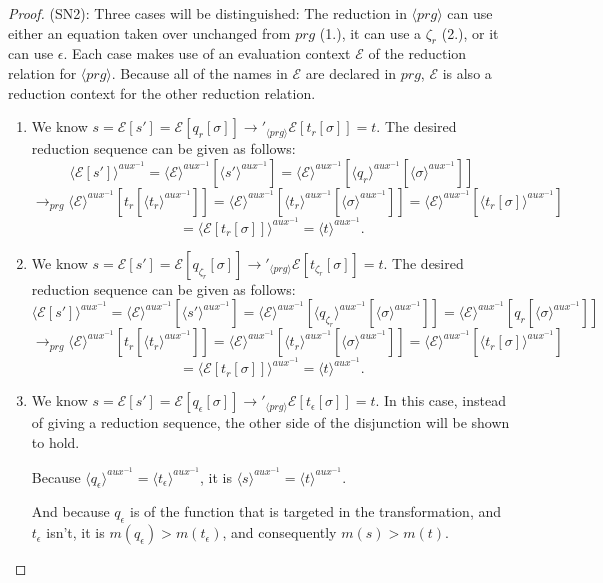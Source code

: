 \begin{proposition}
\begin{proof}
(SN2): Three cases will be distinguished: The reduction in $\langle prg \rangle$ can use either an equation taken over unchanged from $prg$ (1.), it can use a $\zeta_r$ (2.), or it can use $\epsilon$. Each case makes use of an evaluation context $\mathcal{E}$ of the reduction relation for $\langle prg \rangle$. Because all of the names in $\mathcal{E}$ are declared in $prg$, $\mathcal{E}$ is also a reduction context for the other reduction relation.
\begin{enumerate}
\item We know $s = \mathcal{E}[s'] = \mathcal{E}[q_r[\sigma]] \longrightarrow'_{\langle prg \rangle} \mathcal{E}[t_r[\sigma]] = t$. The desired reduction sequence can be given as follows:
\[
\langle \mathcal{E}[s'] \rangle^{aux^{-1}} = \langle \mathcal{E} \rangle^{aux^{-1}}[\langle s' \rangle^{aux^{-1}}] = \langle \mathcal{E} \rangle^{aux^{-1}}[\langle q_r \rangle^{aux^{-1}}[\langle \sigma \rangle^{aux^{-1}}]]
\]
\[
 \longrightarrow_{prg} \langle \mathcal{E} \rangle^{aux^{-1}}[t_r[\langle t_r \rangle^{aux^{-1}}]] = \langle \mathcal{E} \rangle^{aux^{-1}}[\langle t_r \rangle^{aux^{-1}}[\langle \sigma \rangle^{aux^{-1}}]] = \langle \mathcal{E} \rangle^{aux^{-1}}[\langle t_r[\sigma] \rangle^{aux^{-1}}]
\]
\[
= \langle \mathcal{E}[t_r[\sigma]] \rangle^{aux^{-1}} = \langle t \rangle^{aux^{-1}}.
\]

\item We know $s = \mathcal{E}[s'] = \mathcal{E}[q_{\zeta_r}[\sigma]] \longrightarrow'_{\langle prg \rangle} \mathcal{E}[t_{\zeta_r}[\sigma]] = t$. The desired reduction sequence can be given as follows:
\[
\langle \mathcal{E}[s'] \rangle^{aux^{-1}} = \langle \mathcal{E} \rangle^{aux^{-1}}[\langle s' \rangle^{aux^{-1}}] = \langle \mathcal{E} \rangle^{aux^{-1}}[\langle q_{\zeta_r} \rangle^{aux^{-1}}[\langle \sigma \rangle^{aux^{-1}}]] = \langle \mathcal{E} \rangle^{aux^{-1}}[q_r[\langle \sigma \rangle^{aux^{-1}}]]
\]
\[
\longrightarrow_{prg} \langle \mathcal{E} \rangle^{aux^{-1}}[t_r[\langle t_r \rangle^{aux^{-1}}]] = \langle \mathcal{E} \rangle^{aux^{-1}}[\langle t_r \rangle^{aux^{-1}}[\langle \sigma \rangle^{aux^{-1}}]] = \langle \mathcal{E} \rangle^{aux^{-1}}[\langle t_r[\sigma] \rangle^{aux^{-1}}]
\]
\[
= \langle \mathcal{E}[t_r[\sigma]] \rangle^{aux^{-1}} = \langle t \rangle^{aux^{-1}}.
\]

\item We know $s = \mathcal{E}[s'] = \mathcal{E}[q_\epsilon[\sigma]] \longrightarrow'_{\langle prg \rangle} \mathcal{E}[t_\epsilon[\sigma]] = t$. In this case, instead of giving a reduction sequence, the other side of the disjunction will be shown to hold.

Because $\langle q_\epsilon \rangle^{aux^{-1}} = \langle t_\epsilon \rangle^{aux^{-1}}$, it is $\langle s \rangle^{aux^{-1}} = \langle t \rangle^{aux^{-1}}$.

And because $q_\epsilon$ is of the function that is targeted in the transformation, and $t_\epsilon$ isn't, it is $m(q_\epsilon) > m(t_\epsilon)$, and consequently $m(s) > m(t)$.
\end{enumerate}
\end{proof}
\end{proposition}

